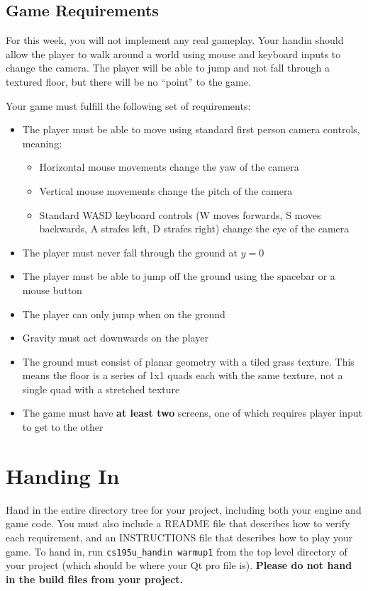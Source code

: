 \documentclass{../cs195u}
\begin{document}
  \subsection*{Game Requirements}
  For this week, you will not implement any real gameplay. Your handin should allow the player to walk around a world using mouse and keyboard inputs to change the camera. The player will be able to jump and not fall through a textured floor, but there will be no ``point'' to the game.
 
  Your game must fulfill the following set of requirements:
  \begin{itemize}
   \item The player must be able to move using standard first person camera controls, meaning:
   \begin{itemize}
    \item Horizontal mouse movements change the yaw of the camera
    \item Vertical mouse movements change the pitch of the camera
    \item Standard WASD keyboard controls (W moves forwards, S moves backwards, A strafes left, D strafes right) change the eye of the camera
   \end{itemize}
   \item The player must never fall through the ground at $y = 0$
   \item The player must be able to jump off the ground using the spacebar or a mouse button
   \item The player can only jump when on the ground
   \item Gravity must act downwards on the player
   \item The ground must consist of planar geometry with a tiled grass texture. This means the floor is a series of 1x1 quads each with the same texture, not a single quad with a stretched texture
   \item The game must have \textbf{at least two} screens, one of which requires player input to get to the other
  \end{itemize}


 \section*{Handing In}
Hand in the entire directory tree for your project, including both your engine and game code. You must also include a README file that describes how to verify each requirement, and an INSTRUCTIONS file that describes how to play your game. To hand in, run \texttt{cs195u\_handin warmup1} from the top level directory of your project (which should be where your Qt pro file is). \textbf{Please do not hand in the build files from your project.}
\end{document}
